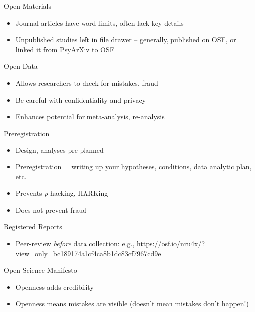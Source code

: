 \documentclass[
  ignorenonframetext,
  aspectratio=169,
]{beamer}
\providecommand{\tightlist}{%
  \setlength{\itemsep}{0pt}\setlength{\parskip}{0pt}}\usepackage{longtable,booktabs,array}
\begin{document}
\begin{frame}{Open Materials}
\label{open-materials}
\begin{itemize}
\tightlist
\item
  Journal articles have word limits, often lack key details
\item
  Unpublished studies left in file drawer -- generally, published on
  OSF, or linked it from PsyArXiv to OSF
\end{itemize}
\end{frame}

\begin{frame}{Open Data}
\label{open-data}
\begin{itemize}
\tightlist
\item
  Allows researchers to check for mistakes, fraud
\item
  Be careful with confidentiality and privacy
\item
  Enhances potential for meta-analysis, re-analysis
\end{itemize}
\end{frame}

\begin{frame}{Preregistration}
\label{preregistration}
\begin{itemize}
\tightlist
\item
  Design, analyses pre-planned
\item
  Preregistration = writing up your hypotheses, conditions, data
  analytic plan, etc.
\item
  Prevents \emph{p}-hacking, HARKing
\item
  Does not prevent fraud
\end{itemize}
\end{frame}

\begin{frame}{Registered Reports}
\label{registered-reports}
\begin{itemize}
\tightlist
\item
  Peer-review \emph{before} data collection: e.g.,
  \url{https://osf.io/nru4x/?view_only=bc189174a1cf4ca8b1dc83cf7967cd9e}
\end{itemize}
\end{frame}

\begin{frame}{Open Science Manifesto}
\label{open-science-manifesto}
\begin{itemize}
\tightlist
\item
  Openness adds credibility
\item
  Openness means mistakes are visible (doesn't mean mistakes don't
  happen!)
\end{itemize}
\end{frame}
\end{document}
